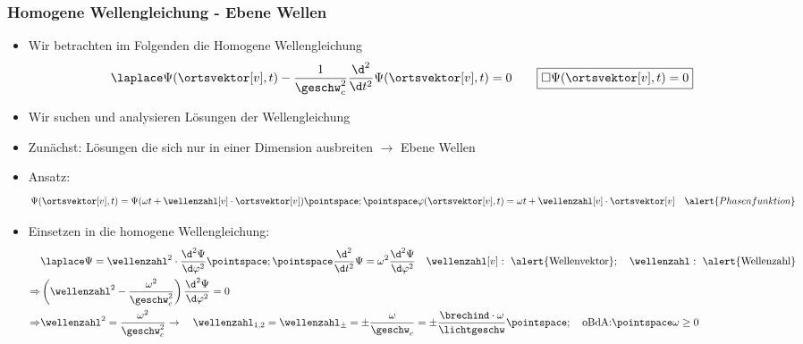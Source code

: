 \begin{frame}
  \frametitle{Homogene Wellengleichung - Ebene Wellen}
  \begin{itemize}[<+->]
\item Wir betrachten im Folgenden die \alert{Homogene Wellengleichung}
    \begin{equation*}
\laplace\Psi (\ortsvektor[v], t) - \frac{1}{\geschw_{c}^2}\frac{\d ^2}{\d t^2}\Psi (\ortsvektor[v], t) = 0 \qquad \boxed{\square \Psi (\ortsvektor[v], t) = 0} 
\end{equation*}
\item Wir suchen und analysieren Lösungen der Wellengleichung
\item Zunächst: Lösungen die sich nur in \alert{einer Dimension ausbreiten} \(\to\) \alert{Ebene Wellen}
\item Ansatz:
  \begin{equation*}
    \Psi(\ortsvektor[v], t) = \Psi (\omega t + \wellenzahl[v]\cdot\ortsvektor[v]) \pointspace ; \pointspace \varphi (\ortsvektor[v], t) = \omega t + \wellenzahl[v]\cdot\ortsvektor[v] \quad \alert{Phasenfunktion} 
  \end{equation*}
\item Einsetzen in die homogene Wellengleichung:
  \begin{align*}
& \laplace\Psi = \wellenzahl^2\cdot\frac{\d^2 \Psi}{\d \varphi^2}\pointspace ; \pointspace \frac{\d^2}{\d t^2}\Psi = \omega^2\frac{\d^2 \Psi}{\d \varphi^2}\quad\wellenzahl[v]:\text{ \alert{Wellenvektor}};\quad\wellenzahl:\text{ \alert{Wellenzahl}}\\
\Rightarrow &\left( \wellenzahl^2 -\frac{\omega^2}{\geschw_{c}^2}\right)\frac{\d^2 \Psi}{\d \varphi^2} = 0\\
\Rightarrow & \wellenzahl^2 = \frac{\omega^2}{\geschw_{c}^2} \to \quad\wellenzahl_{1,2}=\wellenzahl_\pm=\pm\frac{\omega}{\geschw_{c}}=\pm \frac{\brechind\cdot \omega}{\lichtgeschw}\pointspace;\quad \text{oBdA:}\pointspace \omega\geq 0
\end{align*}
  \end{itemize}
\end{frame}


